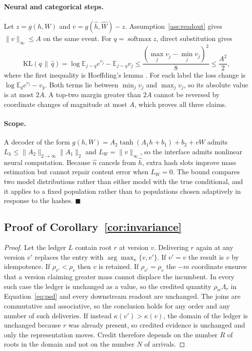 \documentclass{article}
\begin{document}
\paragraph{Neural and categorical steps.}
Let $z=g(h,W)$ and $v=g(\hat h,\hat W)-z$. Assumption~\ref{ass:readout} gives
$\|v\|_\infty\le A$ on the same event. For $q=\operatorname{softmax}z$, direct
substitution gives
\begin{equation}
\mathrm{KL}(q\,\|\,\hat q)=\log\mathbb E_{j\sim q}e^{v_j}-\mathbb E_{j\sim q}v_j
\le\frac{(\max_jv_j-\min_jv_j)^2}{8}\le\frac{A^2}{2},
\end{equation}
where the first inequality is Hoeffding's lemma
\citep{hoeffding1963probability}. For each label the loss change is
$\log\mathbb E_q e^{v_j}-v_y$. Both terms lie between $\min_jv_j$ and
$\max_jv_j$, so its absolute value is at most $2A$. A top-two margin greater
than $2A$ cannot be reversed by coordinate changes of magnitude at most $A$,
which proves all three claims.

\paragraph{Scope.}
A decoder of the form $g(h,W)=A_2\tanh(A_1h+b_1)+b_2+vW$ admits
$L_h\le\|A_2\|_{2\to\infty}\|A_1\|_2$ and $L_W=\|v\|_\infty$, so the interface
admits nonlinear neural computation. Because $\hat n$ cancels from $\hat h$,
extra hash slots improve mass estimation but cannot repair content error when
$L_W=0$. The bound compares two model distributions rather than either model
with the true conditional, and it applies to a fixed population rather than to
populations chosen adaptively in response to the hashes. $\blacksquare$

\subsection{Proof of Corollary~\ref{cor:invariance}}

\begin{proof}
Let the ledger $L$ contain root $r$ at version $v$. Delivering $r$ again at any
version $v'$ replaces the entry with $\arg\max_\kappa\{v,v'\}$. If $v'=v$ the
result is $v$ by idempotence. If $\rho_{v'}<\rho_v$ then $v$ is retained. If
$\rho_{v'}=\rho_v$ the $-m$ coordinate ensures that a version claiming greater
mass cannot displace the incumbent. In every such case the ledger is unchanged
as a value, so the credited quantity $\rho_{ir}\Lambda_r$ in
Equation~\ref{eq:psd} and every downstream readout are unchanged. The joins are
commutative and associative, so the conclusion holds for any order and any
number of such deliveries. If instead $\kappa(v')>\kappa(v)$, the domain of the
ledger is unchanged because $r$ was already present, so credited evidence is
unchanged and only the representation moves. Credit therefore depends on the
number $R$ of roots in the domain and not on the number $N$ of arrivals.
\end{proof}
\end{document}
